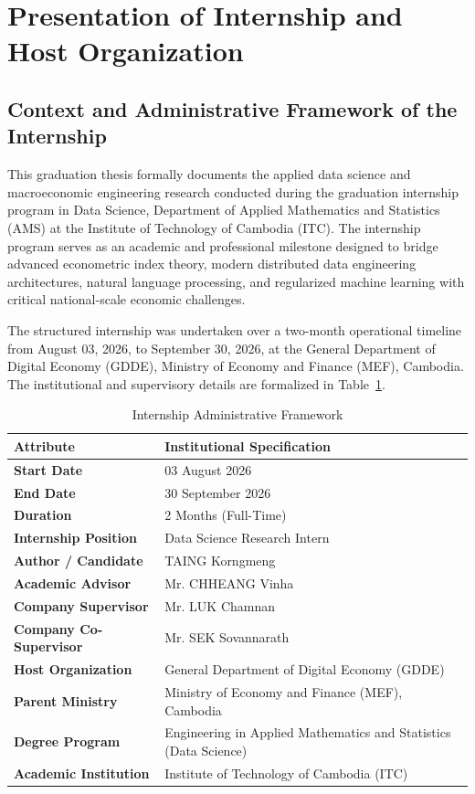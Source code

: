 
\section{Presentation of Internship and Host Organization}

\subsection{Context and Administrative Framework of the Internship}
\hs This graduation thesis formally documents the applied data science and macroeconomic engineering research conducted during the graduation internship program in Data Science, Department of Applied Mathematics and Statistics (AMS) at the Institute of Technology of Cambodia (ITC). The internship program serves as an academic and professional milestone designed to bridge advanced econometric index theory, modern distributed data engineering architectures, natural language processing, and regularized machine learning with critical national-scale economic challenges.

\hs The structured internship was undertaken over a two-month operational timeline from August 03, 2026, to September 30, 2026, at the General Department of Digital Economy (GDDE), Ministry of Economy and Finance (MEF), Cambodia. The institutional and supervisory details are formalized in Table~\ref{table:internship}.

\begin{table}[H]
\centering
\begin{tabularx}{\textwidth}{|>{\raggedright\arraybackslash}p{4.5cm}|X|}
\hline
\rowcolor{blue!20}
\textbf{Attribute} & \textbf{Institutional Specification} \\ \hline
\textbf{Start Date} & 03 August 2026 \\ \hline
\textbf{End Date} & 30 September 2026 \\ \hline
\textbf{Duration} & 2 Months (Full-Time) \\ \hline
\textbf{Internship Position} & Data Science Research Intern \\ \hline
\textbf{Author / Candidate} & TAING Korngmeng \\ \hline
\textbf{Academic Advisor} & Mr. CHHEANG Vinha \\ \hline
\textbf{Company Supervisor} & Mr. LUK Chamnan \\ \hline
\textbf{Company Co-Supervisor} & Mr. SEK Sovannarath \\ \hline
\textbf{Host Organization} & General Department of Digital Economy (GDDE) \\ \hline
\textbf{Parent Ministry} & Ministry of Economy and Finance (MEF), Cambodia \\ \hline
\textbf{Degree Program} & Engineering in Applied Mathematics and Statistics (Data Science) \\ \hline
\textbf{Academic Institution} & Institute of Technology of Cambodia (ITC) \\ \hline
\end{tabularx}
\caption{Internship Administrative Framework}
\label{table:internship}
\end{table}

